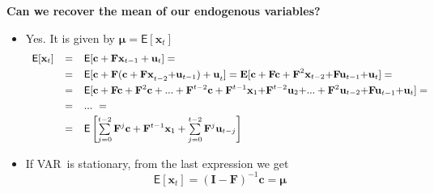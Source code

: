 \documentclass[10pt,handout]{beamer}
\begin{document}
\begin{frame}
{\textbf{Can we recover the mean of our endogenous variables?}}

\begin{itemize}
\item Yes. It is given by $\mathbf{\mu =}\mathsf{E}[\mathbf{x}_{t}]$\medskip %
\pause%
\begin{equation*}
{\small 
\begin{array}{lll}
\mathsf{E}[\mathbf{x}_{t}] & = & \mathsf{E}[\mathbf{c}+\mathbf{Fx}_{t-1}+%
\mathbf{u}_{t}]=\smallskip \\ 
& = & \mathsf{E}[\mathbf{c+F(c+Fx}_{t-2}\mathbf{+u}_{t-1}\mathbf{)+u}_{t}%
\mathbf{]=E[c+Fc+F}^{2}\mathbf{x}_{t-2}\mathbf{+Fu}_{t-1}\mathbf{+u}_{t}%
\mathbf{]=}\smallskip \\ 
& = & \mathsf{E}[\mathbf{c+Fc+F}^{2}\mathbf{c+...+F}^{t-2}\mathbf{c+F}^{t-1}%
\mathbf{x}_{1}\mathbf{+F}^{t-2}\mathbf{u}_{2}\mathbf{+...+F}^{2}\mathbf{u}%
_{t-2}\mathbf{+Fu}_{t-1}\mathbf{+u}_{t}]=\smallskip \\ 
& = & ...\ =\smallskip \\ 
& = & \mathsf{E}\left[ \sum\limits_{j=0}^{t-2}\mathbf{F}^{j}\mathbf{c}+%
\mathbf{F}^{t-1}\mathbf{x}_{1}+\sum\limits_{j=0}^{t-2}\mathbf{F}^{j}\mathbf{u%
}_{t-j}\right]%
\end{array}%
}
\end{equation*}%
\pause

\item If VAR\ is stationary, from the last expression we get%
\begin{equation*}
\mathsf{E}[\mathbf{x}_{t}]=\left( \mathbf{I}-\mathbf{F}\right) ^{-1}\mathbf{c%
}=\mathbf{\mu }
\end{equation*}
\end{itemize}
\end{frame}

\vspace{0.1cm}

\everymath\expandafter{\the\everymath \color{note!80}}
\everydisplay\expandafter{\the\everydisplay \color{note!80}}%
\end{document}
